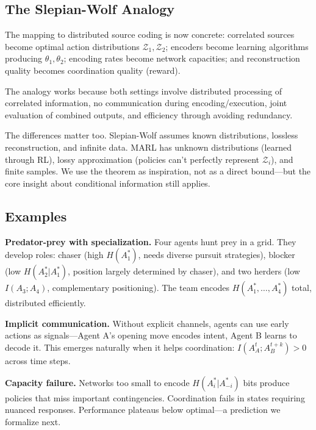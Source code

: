 \documentclass[10pt, letterpaper]{article}
\begin{document}
\subsection{The Slepian-Wolf Analogy}

The mapping to distributed source coding is now concrete: correlated sources become optimal action distributions $\mathcal{Z}_1, \mathcal{Z}_2$; encoders become learning algorithms producing $\theta_1, \theta_2$; encoding rates become network capacities; and reconstruction quality becomes coordination quality (reward).

The analogy works because both settings involve distributed processing of correlated information, no communication during encoding/execution, joint evaluation of combined outputs, and efficiency through avoiding redundancy.

The differences matter too. Slepian-Wolf assumes known distributions, lossless reconstruction, and infinite data. MARL has unknown distributions (learned through RL), lossy approximation (policies can't perfectly represent $\mathcal{Z}_i$), and finite samples. We use the theorem as inspiration, not as a direct bound---but the core insight about conditional information still applies.

\subsection{Examples}

\textbf{Predator-prey with specialization.} Four agents hunt prey in a grid. They develop roles: chaser (high $H(A_1^*)$, needs diverse pursuit strategies), blocker (low $H(A_2^*|A_1^*)$, position largely determined by chaser), and two herders (low $I(A_3; A_4)$, complementary positioning). The team encodes $H(A_1^*, \ldots, A_4^*)$ total, distributed efficiently.

\textbf{Implicit communication.} Without explicit channels, agents can use early actions as signals---Agent A's opening move encodes intent, Agent B learns to decode it. This emerges naturally when it helps coordination: $I(A_A^t; A_B^{t+k}) > 0$ across time steps.

\textbf{Capacity failure.} Networks too small to encode $H(A_i^*|A_{-i}^*)$ bits produce policies that miss important contingencies. Coordination fails in states requiring nuanced responses. Performance plateaus below optimal---a prediction we formalize next.

\end{document}
